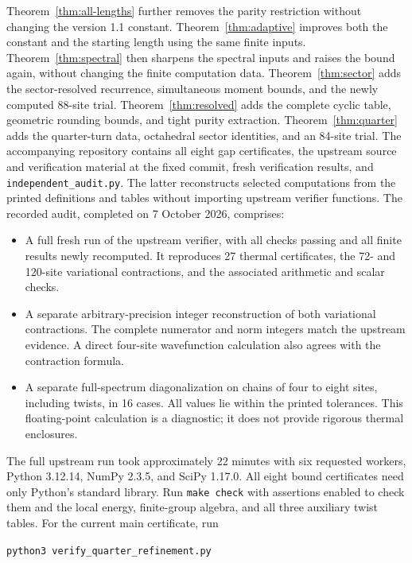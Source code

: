 \documentclass[11pt,a4paper]{article}
\begin{document}
Theorem~\ref{thm:all-lengths} further removes the parity restriction
without changing the version 1.1 constant.
Theorem~\ref{thm:adaptive} improves both the constant and the starting
length using the same finite inputs.
Theorem~\ref{thm:spectral} then sharpens the spectral inputs and raises
the bound again, without changing the finite computation data.
Theorem~\ref{thm:sector} adds the sector-resolved recurrence,
simultaneous moment bounds, and the newly computed 88-site trial.
Theorem~\ref{thm:resolved} adds the complete cyclic table, geometric
rounding bounds, and tight purity extraction.
Theorem~\ref{thm:quarter} adds the quarter-turn data, octahedral sector
identities, and an 84-site trial.
The accompanying repository contains all eight gap certificates,
the upstream source and verification material at the fixed commit,
fresh verification results, and \texttt{independent\_audit.py}.
The latter reconstructs selected computations from the printed
definitions and tables without importing upstream verifier functions.
The recorded audit, completed on 7 October 2026, comprises:
\begin{itemize}
\item A full fresh run of the upstream verifier, with all checks passing
and all finite results newly recomputed.
It reproduces 27 thermal certificates, the 72- and 120-site variational
contractions, and the associated arithmetic and scalar checks.
\item A separate arbitrary-precision integer reconstruction of both
variational contractions. The complete numerator and norm integers
match the upstream evidence. A direct four-site wavefunction calculation
also agrees with the contraction formula.
\item A separate full-spectrum diagonalization on chains of four to
eight sites, including twists, in 16 cases. All values lie within the
printed tolerances. This floating-point calculation is a diagnostic;
it does not provide rigorous thermal enclosures.
\end{itemize}
The full upstream run took approximately 22 minutes with six requested
workers, Python 3.12.14, NumPy 2.3.5, and SciPy 1.17.0.
All eight bound certificates need only Python's standard library.
Run \texttt{make check} with assertions enabled to check them and the
local energy, finite-group algebra, and all three auxiliary twist tables. For the current main certificate, run
\begin{center}
\texttt{python3 verify\_quarter\_refinement.py}
\end{center}
\end{document}
